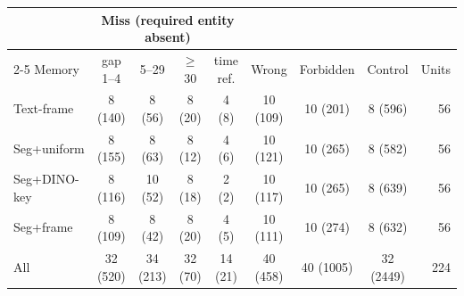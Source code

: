 \begin{tabular}{@{}l *{7}{c} r@{}}
\toprule
 & \multicolumn{4}{c}{Miss (required entity absent)} & & & & \\
\cmidrule(lr){2-5}
Memory & gap 1--4 & 5--29 & $\geq$30 & time ref. & Wrong & Forbidden & Control & Units \\
\midrule
Text-frame & 8 {\scriptsize(140)} & 8 {\scriptsize(56)} & 8 {\scriptsize(20)} & 4 {\scriptsize(8)} & 10 {\scriptsize(109)} & 10 {\scriptsize(201)} & 8 {\scriptsize(596)} & 56 \\
Seg+uniform & 8 {\scriptsize(155)} & 8 {\scriptsize(63)} & 8 {\scriptsize(12)} & 4 {\scriptsize(6)} & 10 {\scriptsize(121)} & 10 {\scriptsize(265)} & 8 {\scriptsize(582)} & 56 \\
Seg+DINO-key & 8 {\scriptsize(116)} & 10 {\scriptsize(52)} & 8 {\scriptsize(18)} & 2 {\scriptsize(2)} & 10 {\scriptsize(117)} & 10 {\scriptsize(265)} & 8 {\scriptsize(639)} & 56 \\
Seg+frame & 8 {\scriptsize(109)} & 8 {\scriptsize(42)} & 8 {\scriptsize(20)} & 4 {\scriptsize(5)} & 10 {\scriptsize(111)} & 10 {\scriptsize(274)} & 8 {\scriptsize(632)} & 56 \\
\midrule
All & 32 {\scriptsize(520)} & 34 {\scriptsize(213)} & 32 {\scriptsize(70)} & 14 {\scriptsize(21)} & 40 {\scriptsize(458)} & 40 {\scriptsize(1005)} & 32 {\scriptsize(2449)} & 224 \\
\bottomrule
\end{tabular}
